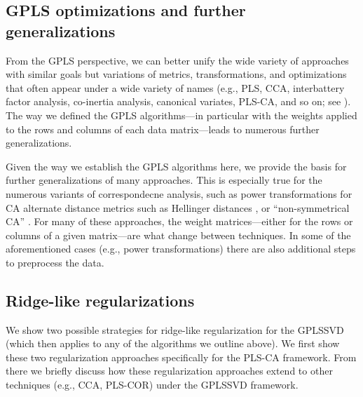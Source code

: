 \documentclass[12pt]{article}
\begin{document}
\hypertarget{gpls-optimizations-and-further-generalizations}{%
\subsection{GPLS optimizations and further
generalizations}\label{gpls-optimizations-and-further-generalizations}}

From the GPLS perspective, we can better unify the wide variety of
approaches with similar goals but variations of metrics,
transformations, and optimizations that often appear under a wide
variety of names (e.g., PLS, CCA, interbattery factor analysis,
co-inertia analysis, canonical variates, PLS-CA, and so on; see
\citet{abdi2017canonical}). The way we defined the GPLS algorithms---in
particular with the weights applied to the rows and columns of each data
matrix---leads to numerous further generalizations.

Given the way we establish the GPLS algorithms here, we provide the
basis for further generalizations of many approaches. This is especially
true for the numerous variants of correspondecne analysis, such as power
transformations for CA \citep{greenacre2009power} alternate distance
metrics such as Hellinger distances
\citep{rao1995review, escofier1978analyse}, or ``non-symmetrical CA''
\citep{d1992non, kroonenberg1999nonsymmetric, takane1991relationships}.
For many of these approaches, the weight matrices---either for the rows
or columns of a given matrix---are what change between techniques. In
some of the aforementioned cases (e.g., power transformations) there are
also additional steps to preprocess the data.

\hypertarget{ridge-like-regularizations}{%
\subsection{Ridge-like
regularizations}\label{ridge-like-regularizations}}

We show two possible strategies for ridge-like regularization for the
GPLSSVD (which then applies to any of the algorithms we outline above).
We first show these two regularization approaches specifically for the
PLS-CA framework. From there we briefly discuss how these regularization
approaches extend to other techniques (e.g., CCA, PLS-COR) under the
GPLSSVD framework.
\end{document}
